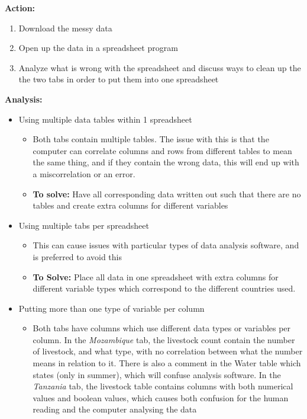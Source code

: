 \documentclass{article}
\begin{document}
\newline
\textbf{Action:}
\begin{enumerate}
    \item Download the messy data
    \item Open up the data in a spreadsheet program
    \item Analyze what is wrong with the spreadsheet and discuss ways to clean up the the two tabs in order to put them into one spreadsheet
\end{enumerate}
\textbf{Analysis:}
\begin{itemize}
    \item Using multiple data tables within 1 spreadsheet
    \begin{itemize}
        \item Both tabs contain multiple tables. The issue with this is that the computer can correlate columns and rows from different tables to mean the same thing, and if they contain the wrong data, this will end up with a miscorrelation or an error.
        \item \textbf{To solve:} Have all corresponding data written out such that there are no tables and create extra columns for different variables
    \end{itemize}
    \item Using multiple tabs per spreadsheet
    \begin{itemize}
        \item This can cause issues with particular types of data analysis software, and is preferred to avoid this
        \item \textbf{To Solve:} Place all data in one spreadsheet with extra columns for different variable types which correspond to the different countries used.
    \end{itemize}
    \item Putting more than one type of variable per column
    \begin{itemize}
        \item Both tabs have columns which use different data types or variables per column. In the \textit{Mozambique} tab, the livestock count contain the number of livestock, and what type, with no correlation between what the number means in relation to it. There is also a comment in the Water table which states (only in summer), which will confuse analysis software. In the \textit{Tanzania} tab, the livestock table contains columns with both numerical values and boolean values, which causes both confusion for the human reading and the computer analysing the data

\end{itemize}
\end{itemize}
\end{document}
